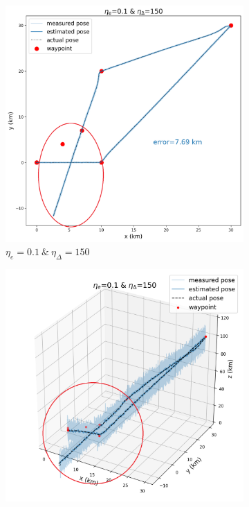 \begin{figure}[]
	\centering
	\begin{subfigure}[t]{0.24\textwidth}
		\centering
		\includegraphics[width=\linewidth]{figures/lookahead_eta_01_150_2d.png}
		\caption{$\eta_e=0.1\:\&\:\eta_\Delta=150$}
	\end{subfigure} 
	\hfill
	\begin{subfigure}[t]{0.24\textwidth}
		\centering
		\includegraphics[width=\linewidth]{figures/lookahead_eta_01_150_3d.png}

\end{subfigure}
\end{figure}
